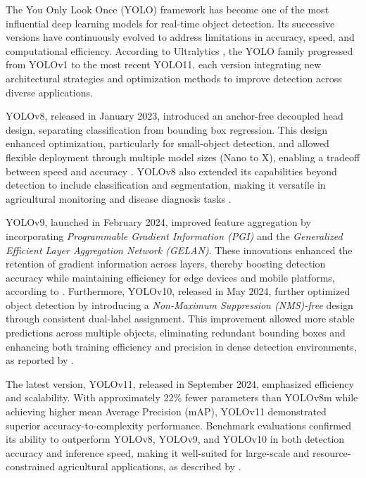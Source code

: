 The You Only Look Once (YOLO) framework has become one of the most influential deep learning models for real-time object detection. Its successive versions have continuously evolved to address limitations in accuracy, speed, and computational efficiency. According to Ultralytics \cite{Terven2023}, the YOLO family progressed from YOLOv1 to the most recent YOLO11, each version integrating new architectural strategies and optimization methods to improve detection across diverse applications.

YOLOv8, released in January 2023, introduced an anchor-free decoupled head design, separating classification from bounding box regression. This design enhanced optimization, particularly for small-object detection, and allowed flexible deployment through multiple model sizes (Nano to X), enabling a tradeoff between speed and accuracy \cite{Wang2023}. YOLOv8 also extended its capabilities beyond detection to include classification and segmentation, making it versatile in agricultural monitoring and disease diagnosis tasks \cite{Vyas2023}.

YOLOv9, launched in February 2024, improved feature aggregation by incorporating \textit{Programmable Gradient Information (PGI)} and the \textit{Generalized Efficient Layer Aggregation Network (GELAN)}. These innovations enhanced the retention of gradient information across layers, thereby boosting detection accuracy while maintaining efficiency for edge devices and mobile platforms, according to \cite{UltralyticsBlog2025}. Furthermore, YOLOv10, released in May 2024, further optimized object detection by introducing a \textit{Non-Maximum Suppression (NMS)-free} design through consistent dual-label assignment. This improvement allowed more stable predictions across multiple objects, eliminating redundant bounding boxes and enhancing both training efficiency and precision in dense detection environments, as reported by \cite{UltralyticsBlog2025}.

The latest version, YOLOv11, released in September 2024, emphasized efficiency and scalability. With approximately 22\% fewer parameters than YOLOv8m while achieving higher mean Average Precision (mAP), YOLOv11 demonstrated superior accuracy-to-complexity performance. Benchmark evaluations confirmed its ability to outperform YOLOv8, YOLOv9, and YOLOv10 in both detection accuracy and inference speed, making it well-suited for large-scale and resource-constrained agricultural applications, as described by \cite{UltralyticsBlog2025}.

